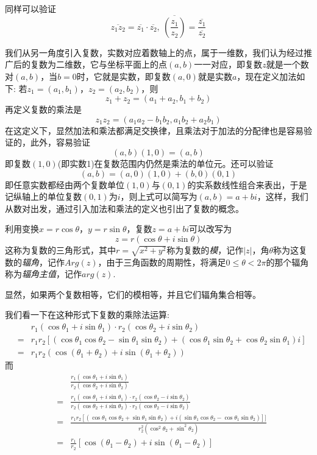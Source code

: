 同样可以验证
\[ \overline{z_1z_2} = \overline{z_1} \cdot \overline{z_2}, \  \overline{\left( \frac{z_1}{z_2} \right)} = \frac{\overline{z_1}}{\overline{z_2}} \]

\begin{example}[从数对引入复数]
  我们从另一角度引入复数，实数对应着数轴上的点，属于一维数，我们认为经过推广后的复数为二维数，它与坐标平面上的点$(a,b)$一一对应，即复数$z$就是一个数对$(a,b)$，当$b=0$时，它就是实数，即复数$(a,0)$就是实数$a$，现在定义加法如下: 若$z_1=(a_1,b_1)$，$z_2=(a_2,b_2)$，则
  \[ z_1 + z_2 = (a_1 + a_2, b_1 + b_2) \]
  再定义复数的乘法是
  \[ z_1z_2 = (a_1a_2-b_1b_2,a_1b_2+a_2b_1) \]
  在这定义下，显然加法和乘法都满足交换律，且乘法对于加法的分配律也是容易验证的，此外，容易验证
  \[ (a,b)(1,0) = (a,b) \]
  即复数$(1,0)$(即实数1)在复数范围内仍然是乘法的单位元。还可以验证
  \[ (a,b) = (a,0)(1,0) + (b,0)(0,1)  \]
  即任意实数都经由两个复数单位$(1,0)$与$(0,1)$的实系数线性组合来表出，于是记纵轴上的单位复数$(0,1)$为$i$，则上式可以简写为$(a,b)=a+bi$，这样，我们从数对出发，通过引入加法和乘法的定义也引出了复数的概念。
\end{example}

利用变换$x=r\cos{\theta}$，$y=r\sin{\theta}$，复数$z=a+bi$可以改写为
\[ z=r(\cos{\theta}+i\sin{\theta}) \]
这称为复数的三角形式，其中$r=\sqrt{x^2+y^2}$称为复数的\emph{模}，记作$|z|$，角$\theta$称为这复数的\emph{辐角}，记作$Arg(z)$，由于三角函数的周期性，将满足$0\leqslant \theta < 2\pi$的那个辐角称为\emph{辐角主值}，记作$arg(z)$.

显然，如果两个复数相等，它们的模相等，并且它们辐角集合相等。

我们看一下在这种形式下复数的乘除法运算:
\begin{eqnarray*}
  &&  r_1(\cos{\theta_1}+i\sin{\theta_1}) \cdot r_2(\cos{\theta_2}+i\sin{\theta_2}) \\
  & = & r_1r_2[(\cos{\theta_1}\cos{\theta_2}-\sin{\theta_1}\sin{\theta_2})+(\cos{\theta_1}\sin{\theta_2}+\cos{\theta_2}\sin{\theta_1})i] \\
  & = & r_1r_2(\cos{(\theta_1+\theta_2)}+i\sin{(\theta_1+\theta_2)})
\end{eqnarray*}
而
\begin{eqnarray*}
  &&  \frac{r_1(\cos{\theta_1}+i\sin{\theta_1})}{r_2(\cos{\theta_2}+i\sin{\theta_2})} \\
  & = & \frac{r_1(\cos{\theta_1}+i\sin{\theta_1}) \cdot r_2(\cos{\theta_2}-i\sin{\theta_2})}{r_2(\cos{\theta_2}+i\sin{\theta_2}) \cdot r_2(\cos{\theta_2}-i\sin{\theta_2})} \\
  & = & \frac{r_1r_2[(\cos{\theta_1}\cos{\theta_2}+\sin{\theta_1}\sin{\theta_2})+i(\sin{\theta_1}\cos{\theta_2}-\cos{\theta_1}\sin{\theta_2})]]}{r_2^2(\cos^2{\theta_2}+\sin^2{\theta_2})} \\
  & = & \frac{r_1}{r_2}[\cos{(\theta_1-\theta_2)+i\sin{(\theta_1-\theta_2)}}]
\end{eqnarray*}

